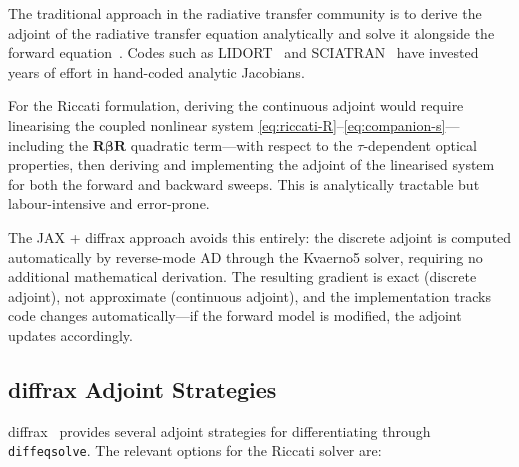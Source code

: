 \documentclass[11pt,a4paper]{article}
\newcommand{\mat}[1]{\mathbf{#1}}
\theoremstyle{definition}
\begin{document}
The traditional approach in the radiative transfer community is to
derive the adjoint of the radiative transfer equation analytically
and solve it alongside the forward
equation~\cite{rozanov2006adjoint,hasekamp2005,spurr2001lidort}.
Codes such as LIDORT~\cite{spurr2001lidort} and
SCIATRAN~\cite{rozanov2006adjoint} have invested years of effort in
hand-coded analytic Jacobians.

For the Riccati formulation, deriving the continuous adjoint would
require linearising the coupled nonlinear system
\eqref{eq:riccati-R}--\eqref{eq:companion-s}---including the
$\mat{R}\mat{\beta}\mat{R}$ quadratic term---with respect to the
$\tau$-dependent optical properties, then deriving and implementing the
adjoint of the linearised system for both the forward and backward
sweeps.  This is analytically tractable but labour-intensive and
error-prone.

The JAX + diffrax approach avoids this entirely: the discrete adjoint
is computed automatically by reverse-mode AD through the Kvaerno5
solver, requiring no additional mathematical derivation.  The resulting
gradient is exact (discrete adjoint), not approximate (continuous
adjoint), and the implementation tracks code changes automatically---if
the forward model is modified, the adjoint updates accordingly.

\subsection{diffrax Adjoint Strategies}\label{sec:diffrax-adjoints}

diffrax~\cite{kidger2022neural} provides several adjoint strategies
for differentiating through \texttt{diffeqsolve}.  The relevant options
for the Riccati solver are:
\end{document}
